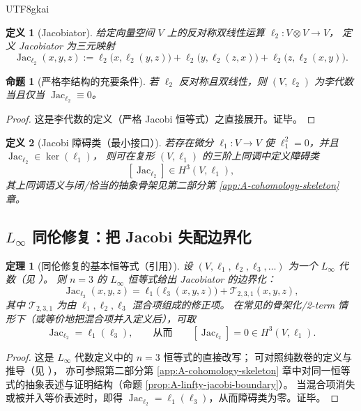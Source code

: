 \documentclass[12pt]{article}
\newtheorem{definition}{定义}[section]
\newtheorem{theorem}{定理}[section]
\newtheorem{proposition}{命题}[section]
\begin{document}
\begin{CJK*}{UTF8}{gkai}
\begin{definition}[Jacobiator]\label{def:B-jacobiator}
给定向量空间 $V$ 上的反对称双线性运算 $\ell_2:V\otimes V\to V$，
定义 Jacobiator 为三元映射
\[
  \operatorname{Jac}_{\ell_2}(x,y,z)
  :=
  \ell_2\bigl(x,\ell_2(y,z)\bigr)
  +\ell_2\bigl(y,\ell_2(z,x)\bigr)
  +\ell_2\bigl(z,\ell_2(x,y)\bigr).
\]
\end{definition}

\begin{proposition}[严格李结构的充要条件]\label{prop:B-strict-lie}
若 $\ell_2$ 反对称且双线性，则 $(V,\ell_2)$ 为李代数当且仅当
$\operatorname{Jac}_{\ell_2}\equiv 0$。
\end{proposition}

\begin{proof}
这是李代数的定义（严格 Jacobi 恒等式）之直接展开。证毕。
\end{proof}

\begin{definition}[Jacobi 障碍类（最小接口）]\label{def:B-jacobi-obstruction}
若存在微分 $\ell_1:V\to V$ 使 $\ell_1^2=0$，并且
$\operatorname{Jac}_{\ell_2}\in \ker(\ell_1)$，
则可在复形 $(V,\ell_1)$ 的三阶上同调中定义障碍类
\[
  [\operatorname{Jac}_{\ell_2}] \in H^3(V,\ell_1),
\]
其上同调语义与闭/恰当的抽象骨架见第二部分第 \ref{app:A-cohomology-skeleton} 章。
\end{definition}

\subsection{$L_\infty$ 同伦修复：把 Jacobi 失配边界化}

\begin{theorem}[同伦修复的基本恒等式（引用）]\label{thm:B-linfty-repair}
设 $(V,\ell_1,\ell_2,\ell_3,\dots)$ 为一个 $L_\infty$ 代数（见 \cite{GaoZheng2025GFramework}）。
则 $n=3$ 的 $L_\infty$ 恒等式给出 Jacobiator 的边界化：
\[
  \operatorname{Jac}_{\ell_2}(x,y,z)
  =
  \ell_1\bigl(\ell_3(x,y,z)\bigr)
  + \mathcal{T}_{2,3,1}(x,y,z),
\]
其中 $\mathcal{T}_{2,3,1}$ 为由 $\ell_1,\ell_2,\ell_3$ 混合项组成的修正项。
在常见的骨架化/2-term 情形下（或等价地把混合项并入定义后），可取
\[
  \operatorname{Jac}_{\ell_2}=\ell_1(\ell_3),
  \qquad\text{从而}\qquad
  [\operatorname{Jac}_{\ell_2}]=0\in H^3(V,\ell_1).
\]
\end{theorem}

\begin{proof}
这是 $L_\infty$ 代数定义中的 $n=3$ 恒等式的直接改写；
可对照纯数卷的定义与推导（见 \cite{GaoZheng2025GFramework}），
亦可参照第二部分第 \ref{app:A-cohomology-skeleton} 章中对同一恒等式的抽象表述与证明结构（命题 \ref{prop:A-linfty-jacobi-boundary}）。
当混合项消失或被并入等价表述时，即得 $\operatorname{Jac}_{\ell_2}=\ell_1(\ell_3)$，从而障碍类为零。证毕。
\end{proof}


\end{CJK*}
\end{document}
